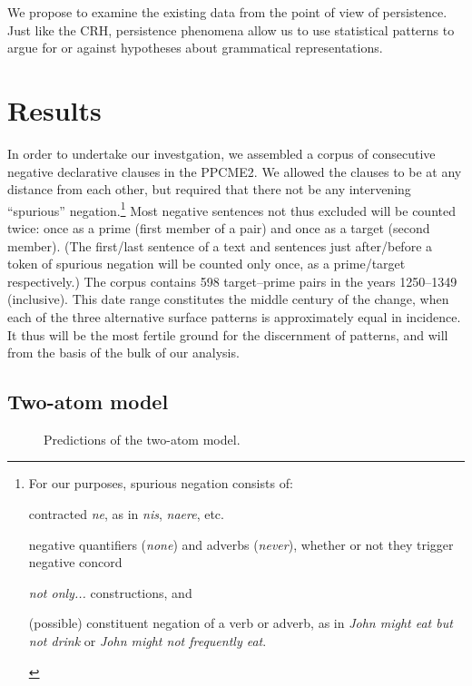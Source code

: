 \documentclass{article}
\begin{document}
We propose to examine the existing data from the point of view of
persistence.  Just like the CRH, persistence phenomena allow us to use
statistical patterns to argue for or against hypotheses about
grammatical representations.    %

\section{Results}
\label{sec:results}

In order to undertake our investgation, we assembled a corpus of
consecutive negative declarative clauses in the PPCME2.  We allowed the
clauses to be at any distance from each other, but required that there
not be any intervening “spurious” negation.\footnote{For our purposes,
    spurious negation consists of:
    \begin{inparaitem}
      \item contracted \emph{ne}, as in \emph{nis}, \emph{naere}, etc.
      \item negative quantifiers (\emph{none}) and adverbs
        (\emph{never}), whether or not they trigger negative concord
      \item \emph{not only...} constructions, and
      \item (possible) constituent negation of a verb or adverb, as in
        \emph{John might eat but not drink} or \emph{John might not
            frequently eat}.
    \end{inparaitem}
}
Most negative sentences not thus excluded will be counted twice: once as
a prime (first member of a pair) and once as a target (second member).
(The first/last sentence of a text and sentences just after/before a
token of spurious negation will be counted only once, as a prime/target
respectively.)  The corpus contains 598 target–prime pairs in the years
1250–1349 (inclusive).  This date range constitutes the middle century
of the change, when each of the three alternative surface patterns is
approximately equal in incidence.  It thus will be the most fertile
ground for the discernment of patterns, and will from the basis of the
bulk of our analysis.

\subsection{Two-atom model}
\label{sec:two-atom-model}

\begin{figure}
    \centering
    
    \caption{Predictions of the two-atom model.}
    \label{fig:two-atom}
\end{figure}
\end{document}
